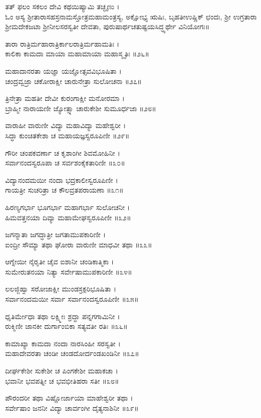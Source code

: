 ತತ್ ಫಲಂ ಸಕಲಂ ದೇವಿ ಕಥಯಿಷ್ಯಾಮಿ ತಚ್ಛೃಣು ।\\

ಓಂ ಅಸ್ಯ ಶ್ರೀತಾರಾಸಹಸ್ರನಾಮಸ್ತೋತ್ರಮಹಾಮಂತ್ರಸ್ಯ,
ಅಕ್ಷೋಭ್ಯ ಋಷಿಃ, ಬೃಹತೀಉಷ್ಣಿಕ್ ಛಂದಃ,
ಶ್ರೀ ಉಗ್ರತಾರಾ ಶ್ರೀಮದೇಕಜಟಾ ಶ್ರೀನೀಲಸರಸ್ವತೀ ದೇವತಾ,
ಪುರುಷಾರ್ಥಚತುಷ್ಟಯಸಿದ್ಧ್ಯರ್ಥೇ ವಿನಿಯೋಗಃ॥

ತಾರಾ ರಾತ್ರಿರ್ಮಹಾರಾತ್ರಿರ್ಕಾಲರಾತ್ರಿರ್ಮಹಾಮತಿಃ ।\\
ಕಾಲಿಕಾ ಕಾಮದಾ ಮಾಯಾ ಮಹಾಮಾಯಾ ಮಹಾಸ್ಮೃತಿಃ ॥೨೬॥

ಮಹಾದಾನರತಾ ಯಜ್ಞಾ ಯಜ್ಞೋತ್ಸವವಿಭೂಷಿತಾ ।\\
ಚಂದ್ರವ್ವಜ್ರಾ ಚಕೋರಾಕ್ಷೀ ಚಾರುನೇತ್ರಾ ಸುಲೋಚನಾ ॥೨೭॥

ತ್ರಿನೇತ್ರಾ ಮಹತೀ ದೇವೀ ಕುರಂಗಾಕ್ಷೀ ಮನೋರಮಾ ।\\
ಬ್ರಾಹ್ಮೀ ನಾರಾಯಣೀ ಜ್ಯೋತ್ಸ್ನಾ ಚಾರುಕೇಶೀ ಸುಮೂರ್ಧಜಾ ॥೨೮॥

ವಾರಾಹೀ ವಾರುಣೀ ವಿದ್ಯಾ ಮಹಾವಿದ್ಯಾ ಮಹೇಶ್ವರೀ ।\\
ಸಿದ್ಧಾ ಕುಂಚಿತಕೇಶಾ ಚ ಮಹಾಯಜ್ಞಸ್ವರೂಪಿಣೀ ॥೨೯॥

ಗೌರೀ ಚಂಪಕವರ್ಣಾ ಚ ಕೃಶಾಂಗೀ ಶಿವಮೋಹಿನೀ ।\\
ಸರ್ವಾನಂದಸ್ವರೂಪಾ ಚ ಸರ್ವಶಂಕೈಕತಾರಿಣೀ ॥೩೦॥

ವಿದ್ಯಾನಂದಮಯೀ ನಂದಾ ಭದ್ರಕಾಲೀಸ್ವರೂಪಿಣೀ ।\\
ಗಾಯತ್ರೀ ಸುಚರಿತ್ರಾ ಚ ಕೌಲವ್ರತಪರಾಯಣಾ ॥೩೧॥

ಹಿರಣ್ಯಗರ್ಭಾ ಭೂಗರ್ಭಾ ಮಹಾಗರ್ಭಾ ಸುಲೋಚನೀ ।\\
ಹಿಮವತ್ತನಯಾ ದಿವ್ಯಾ ಮಹಾಮೇಘಸ್ವರೂಪಿಣೀ ॥೩೨॥

ಜಗನ್ಮಾತಾ ಜಗದ್ಧಾತ್ರೀ ಜಗತಾಮುಪಕಾರಿಣೀ ।\\
ಐಂದ್ರೀ ಸೌಮ್ಯಾ ತಥಾ ಘೋರಾ ವಾರುಣೀ ಮಾಧವೀ ತಥಾ ॥೩೩॥

ಆಗ್ನೇಯೀ ನೈರೃತೀ ಚೈವ ಐಶಾನೀ ಚಂಡಿಕಾತ್ಮಿಕಾ ।\\
ಸುಮೇರುತನಯಾ ನಿತ್ಯಾ ಸರ್ವೇಷಾಮುಪಕಾರಿಣೀ ॥೩೪॥

ಲಲಜ್ಜಿಹ್ವಾ ಸರೋಜಾಕ್ಷೀ ಮುಂಡಸ್ರಕ್ಪರಿಭೂಷಿತಾ ।\\
ಸರ್ವಾನಂದಮಯೀ ಸರ್ವಾ ಸರ್ವಾನಂದಸ್ವರೂಪಿಣೀ ॥೩೫॥

ಧೃತಿರ್ಮೇಧಾ ತಥಾ ಲಕ್ಷ್ಮೀಃ ಶ್ರದ್ಧಾ ಪನ್ನಗಗಾಮಿನೀ ।\\
ರುಕ್ಮಿಣೀ ಜಾನಕೀ ದುರ್ಗಾಂಬಿಕಾ ಸತ್ಯವತೀ ರತಿಃ ॥೩೬॥

ಕಾಮಾಖ್ಯಾ ಕಾಮದಾ ನಂದಾ ನಾರಸಿಂಹೀ ಸರಸ್ವತೀ ।\\
ಮಹಾದೇವರತಾ ಚಂಡೀ ಚಂಡದೋರ್ದಂಡಖಂಡಿನೀ ॥೩೭॥

ದೀರ್ಘಕೇಶೀ ಸುಕೇಶೀ ಚ ಪಿಂಗಕೇಶೀ ಮಹಾಕಚಾ ।\\
ಭವಾನೀ ಭವಪತ್ನೀ ಚ ಭವಭೀತಿಹರಾ ಸತೀ ॥೩೮॥

ಪೌರಂದರೀ ತಥಾ ವಿಷ್ಣೋರ್ಜಾಯಾ ಮಾಹೇಶ್ವರೀ ತಥಾ ।\\
ಸರ್ವೇಷಾಂ ಜನನೀ ವಿದ್ಯಾ ಚಾರ್ವಂಗೀ ದೈತ್ಯನಾಶಿನೀ ॥೩೯॥


